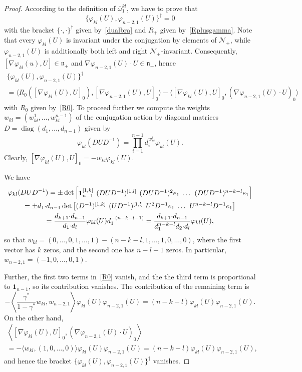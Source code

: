 \documentclass{amsart}
\theoremstyle{definition}
\theoremstyle{remark}
\numberwithin{equation}{section}
\numberwithin{theorem}{section}
\def\N{\mathcal N}
\def\fy{\varphi}
\def\n{\mathfrak n}
\def\nar{\setlength\arraycolsep{2pt}}
\def\one{\mathbf 1}
\def\Poi{{\{{\cdot},{\cdot}\}}}
\def\diag{\operatorname{diag}}
\begin{document}
\begin{proof}
According to the definition of $\bar\omega_1^{kl}$, we have to prove that 
\[
\{\fy_{kl}(U),\fy_{n-2,1}(U)\}^\dag=0
\]
with the bracket $\Poi^\dag$ given by~\eqref{dualbra} and $R_+$ given by~\eqref{Rplusgamma}. Note that every $\fy_{kl}(U)$ is invariant under the conjugation by elements of $\N_+$, while $\fy_{n-2,1}(U)$ is additionally both left and right $\N_+$-invariant. Consequently, $[\nabla\fy_{kl}(u),U]\in\n_+$ and $\nabla\fy_{n-2,1}(U){\cdot} U\in\n_+$, hence
\begin{multline*}
\{\fy_{kl}(U),\fy_{n-2,1}(U)\}^\dag\\=\langle R_0([\nabla \fy_{kl}(U),U]_0),[\nabla\fy_{n-2,1}(U),U]_0\rangle
-\langle[\nabla \fy_{kl}(U),U]_0,(\nabla\fy_{n-2,1}(U){\cdot} U)_0\rangle
\end{multline*}
with $R_0$ given by~\eqref{R0}. To proceed further we compute the weights $w_{kl}=(w_{kl}^1,\dots,\allowbreak 
w_{kl}^{n-1})$ of the conjugation action by diagonal matrices $D=\diag(d_1,\dots,d_{n-1})$ given by
\[
\fy_{kl}(DUD^{-1})=\prod_{i=1}^{n-1}d_i^{w_{kl}^i}\fy_{kl}(U).
\]
Clearly, $[\nabla \fy_{kl}(U),U]_0=-w_{kl}\fy_{kl}(U)$.

We have
\begin{multline*}\nar
\fy_{kl}(DUD^{-1})=\pm\det\begin{bmatrix}\one_{n-1}^{[1,k]}& (DUD^{-1})^{[1,l]}& (DUD^{-1})^2e_1& \dots&  (DUD^{-1})^{n-k-l}e_1\end{bmatrix}\\
=\pm d_1{\cdot} d_{n-1}\det\nar\begin{bmatrix}(D^{-1})^{[1,k]}& (UD^{-1})^{[1,l]}& U^2D^{-1}e_1& \dots & U^{n-k-l}D^{-1}e_1\end{bmatrix}\\
=\frac{d_{k+1}{\cdot} d_{n-1}}{d_1{\cdot} d_l}\fy_{kl}(U)d_1^{-(n-k-l-1)}=\frac{d_{k+1}{\cdot} d_{n-1}}
{d_1^{n-k-l}d_2{\cdot} d_l}\fy_{kl}(U),
\end{multline*}
so that
$w_{kl}=(0,\dots,0,1,\dots,1)-(n-k-l,1,\dots,1,0,\dots,0)$,
where the first vector has $k$ zeros, and the second one has $n-l-1$ zeros. In particular, $w_{n-2,1}=(-1,0,\dots,0,1)$.

Further, the first two terms in~\eqref{R0} vanish, and the the third term is proportional to $\one_{n-1}$, so its contribution vanishes. The contribution of the remaining term is 
\[
-\left\langle\frac{\gamma^*}{1-\gamma^*}w_{kl},w_{n-2,1}\right\rangle\fy_{kl}(U)\fy_{n-2,1}(U)=(n-k-l)\fy_{kl}(U)\fy_{n-2,1}(U).
\]
 On the other hand,  
\begin{multline*}
\left\langle[\nabla \fy_{kl}(U),U]_0,(\nabla\fy_{n-2,1}(U){\cdot} U)_0\right\rangle\\=
-\langle w_{kl},(1,0,\dots,0)\rangle\fy_{kl}(U)\fy_{n-2,1}(U)=(n-k-l)\fy_{kl}(U)\fy_{n-2,1}(U),
\end{multline*}
and hence the bracket $\{\fy_{kl}(U),\fy_{n-2,1}(U)\}^\dag$ vanishes.
\end{proof}
\end{document}
